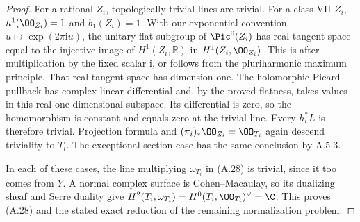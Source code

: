 \begin{proof}
For a rational $Z_i$, topologically trivial lines are trivial. For a class VII $Z_i$, $h^1(\OO_{Z_i})=1$ and $b_1(Z_i)=1$. With our exponential convention $u\mapsto\exp(2\pi\mathrm i u)$, the unitary-flat subgroup of $\Pic^0(Z_i)$ has real tangent space equal to the injective image of $H^1(Z_i,\mathbb R)$ in $H^1(Z_i,\OO_{Z_i})$. This is \cite[Lemma~2.3(2)]{Teleman2006} after multiplication by the fixed scalar $\mathrm i$, or follows from the pluriharmonic maximum principle. That real tangent space has dimension one. The holomorphic Picard pullback has complex-linear differential and, by the proved flatness, takes values in this real one-dimensional subspace. Its differential is zero, so the homomorphism is constant and equals zero at the trivial line. Every $h_i^*L$ is therefore trivial. Projection formula and $(\pi_i)_*\OO_{Z_i}=\OO_{T_i}$ again descend triviality to $T_i$. The exceptional-section case has the same conclusion by A.5.3.

In each of these cases, the line multiplying $\omega_{T_i}$ in (A.28) is trivial, since it too comes from $Y$. A normal complex surface is Cohen--Macaulay, so its dualizing sheaf and Serre duality give $H^2(T_i,\omega_{T_i})=H^0(T_i,\OO_{T_i})^\vee=\C$. This proves (A.28) and the stated exact reduction of the remaining normalization problem.
\end{proof}

